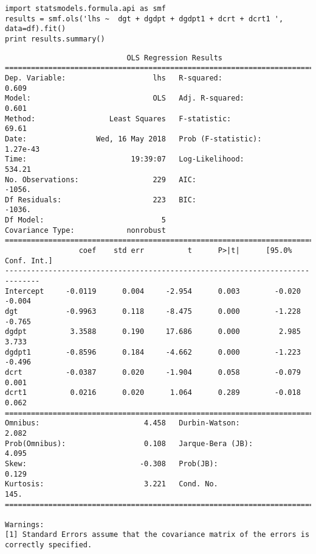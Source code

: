 \documentclass[12pt,fleqn]{article}\usepackage{../../common}
\begin{document}
\begin{verbatim}
import statsmodels.formula.api as smf
results = smf.ols('lhs ~  dgt + dgdpt + dgdpt1 + dcrt + dcrt1 ', data=df).fit()
print results.summary()
\end{verbatim}

\begin{verbatim}
                            OLS Regression Results                            
==============================================================================
Dep. Variable:                    lhs   R-squared:                       0.609
Model:                            OLS   Adj. R-squared:                  0.601
Method:                 Least Squares   F-statistic:                     69.61
Date:                Wed, 16 May 2018   Prob (F-statistic):           1.27e-43
Time:                        19:39:07   Log-Likelihood:                 534.21
No. Observations:                 229   AIC:                            -1056.
Df Residuals:                     223   BIC:                            -1036.
Df Model:                           5                                         
Covariance Type:            nonrobust                                         
==============================================================================
                 coef    std err          t      P>|t|      [95.0% Conf. Int.]
------------------------------------------------------------------------------
Intercept     -0.0119      0.004     -2.954      0.003        -0.020    -0.004
dgt           -0.9963      0.118     -8.475      0.000        -1.228    -0.765
dgdpt          3.3588      0.190     17.686      0.000         2.985     3.733
dgdpt1        -0.8596      0.184     -4.662      0.000        -1.223    -0.496
dcrt          -0.0387      0.020     -1.904      0.058        -0.079     0.001
dcrt1          0.0216      0.020      1.064      0.289        -0.018     0.062
==============================================================================
Omnibus:                        4.458   Durbin-Watson:                   2.082
Prob(Omnibus):                  0.108   Jarque-Bera (JB):                4.095
Skew:                          -0.308   Prob(JB):                        0.129
Kurtosis:                       3.221   Cond. No.                         145.
==============================================================================

Warnings:
[1] Standard Errors assume that the covariance matrix of the errors is correctly specified.
\end{verbatim}
\end{document}

